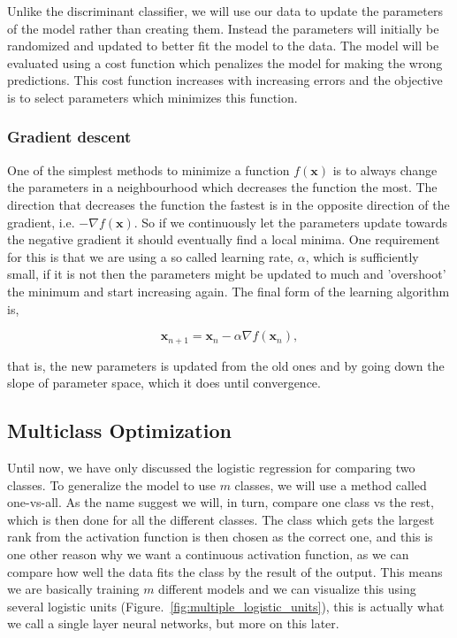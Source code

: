 Unlike the discriminant classifier, we will use our data to update the parameters of the model rather than creating them. Instead the parameters will initially be randomized and updated to better fit the model to the data. The model will be evaluated using a cost function which penalizes the model for making the wrong predictions. This cost function increases with increasing errors and the objective is to select parameters which minimizes this function.

\subsubsection{Gradient descent}

One of the simplest methods to minimize a function $f(\bm{x})$ is to always change the parameters in a neighbourhood which decreases the function the most. The direction that decreases the function the fastest is in the opposite direction of the gradient, i.e. $-\nabla f(\bm{x})$. So if we continuously let the parameters update towards the negative gradient it should eventually find a local minima. One requirement for this is that we are using a so called learning rate, $\alpha$, which is sufficiently small, if it is not then the parameters might be updated to much and 'overshoot' the minimum and start increasing again. The final form of the learning algorithm is,

\begin{equation}
    \bm{x}_{n+1} = \bm{x}_n-\alpha \nabla f(\bm{x}_n),
\end{equation}

that is, the new parameters is updated from the old ones and by going down the slope of parameter space, which it does until convergence.

\subsection{Multiclass Optimization}

Until now, we have only discussed the logistic regression for comparing two classes. To generalize the model to use $m$ classes, we will use a method called one-vs-all. As the name suggest we will, in turn, compare one class vs the rest, which is then done for all the different classes. The class which gets the largest rank from the activation function is then chosen as the correct one, and this is one other reason why we want a continuous activation function, as we can compare how well the data fits the class by the result of the output. This means we are basically training $m$ different models and we can visualize this using several logistic units (Figure.~\ref{fig:multiple_logistic_units}), this is actually what we call a single layer neural networks, but more on this later.

